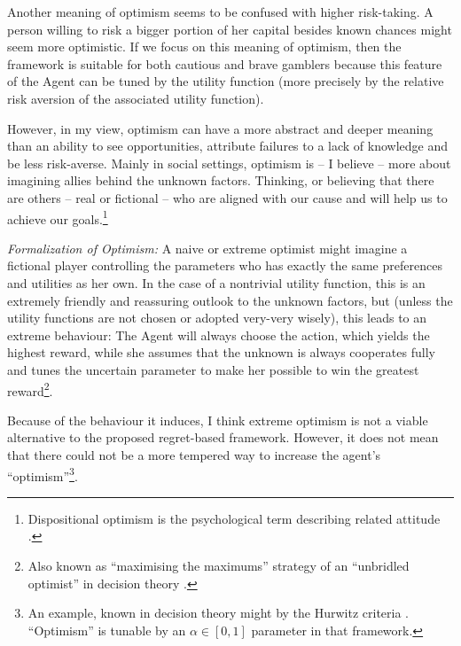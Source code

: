 \documentclass{article}
\begin{document}
Another meaning of optimism seems to be confused with higher risk-taking. A person willing to risk a bigger portion of her capital besides known chances might seem more optimistic. If we focus on this meaning of optimism, then the framework is suitable for both cautious and brave gamblers because this feature of the Agent can be tuned by the utility function (more precisely by the relative risk aversion of the associated utility function).

However, in my view, optimism can have a more abstract and deeper meaning than an ability to see opportunities, attribute failures to a lack of knowledge and be less risk-averse. Mainly in social settings, optimism is -- I believe -- more about imagining allies behind the unknown factors. Thinking, or believing that there are others -- real or fictional -- who are aligned with our cause and will help us to achieve our goals.\footnote{Dispositional optimism is the psychological term describing related attitude \cite{paper:DispositionalOptimism}.}

{\it Formalization of Optimism:}
A naive or extreme optimist might imagine a fictional player controlling the parameters who has exactly the same preferences and utilities as her own.
In the case of a nontrivial utility function, this is an extremely friendly and reassuring outlook to the unknown factors, but (unless the utility functions are not chosen or adopted very-very wisely), this leads to an extreme behaviour: The Agent will always choose the action, which yields the highest reward, while she assumes that the unknown is always cooperates fully and tunes the uncertain parameter to make her possible to win the greatest reward\footnote{Also known as ``maximising the maximums'' strategy of an ``unbridled optimist'' in decision theory \cite{book:ResnikDecisionTheory}.}.

Because of the behaviour it induces, I think extreme optimism is not a viable alternative to the proposed regret-based framework. However, it does not mean that there could not be a more tempered way to increase the agent's ``optimism''\footnote{An example, known in decision theory might by the Hurwitz criteria \cite{paper:Milnor,web:HurwiczCriterion}. ``Optimism'' is tunable by an $\alpha \in [0,1]$ parameter in that framework.}.
\end{document}

